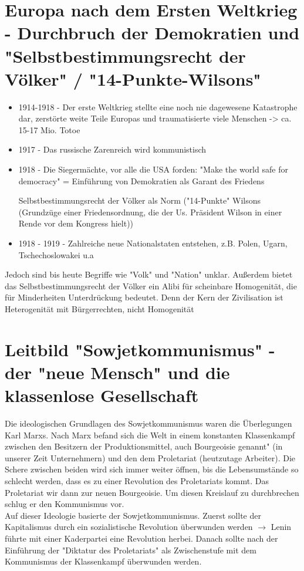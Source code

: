 \documentclass{article}
\begin{document}
\section*{Europa nach dem Ersten Weltkrieg - Durchbruch der Demokratien und "Selbstbestimmungsrecht der Völker" / "14-Punkte-Wilsons"}

\begin{itemize}
    \item 1914-1918 - Der erste Weltkrieg stellte eine noch nie
          dagewesene Katastrophe dar, zerstörte weite Teile
          Europas und traumatisierte viele Menschen -> ca. 15-17 Mio. Totoe
    \item 1917 - Das russische Zarenreich wird kommunistisch
    \item 1918 - Die Siegermächte, vor alle die USA forden:
          "Make the world safe for democracy" = Einführung von
          Demokratien als Garant des Friedens

          Selbstbestimmungsrecht der Völker als Norm
          ("14-Punkte" Wilsons (Grundzüge einer Friedensordnung,
          die der Us. Präsident Wilson in einer Rende vor dem
          Kongress hielt))

    \item 1918 - 1919 - Zahlreiche neue Nationalstaten entstehen, z.B.
          Polen, Ugarn, Tschechoslowakei u.a

\end{itemize}
Jedoch sind bis heute Begriffe wie "Volk" und "Nation" unklar.
Außerdem bietet das Selbstbestimmungsrecht der Völker ein Alibi
für scheinbare Homogenität, die für Minderheiten Unterdrückung
bedeutet. Denn der Kern der Zivilisation ist Heterogenität mit
Bürgerrechten, nicht Homogenität

\section*{Leitbild "Sowjetkommunismus" - der "neue Mensch" und die klassenlose Gesellschaft}
Die ideologischen Grundlagen des Sowjetkommunismus waren die
Überlegungen Karl Marxs. Nach Marx befand sich die Welt in
einem konstanten Klassenkampf zwischen den Besitzern der
Produktionsmittel, auch Bourgeoisie genannt" (in unserer Zeit Unternehmern) und den
dem Proletariat (heutzutage Arbeiter). Die Schere zwischen
beiden wird sich immer weiter öffnen, bis die Lebensumstände
so schlecht werden, dass es zu einer Revolution des Proletariats
kommt. Das Proletariat wir dann zur neuen Bourgeoisie. Um diesen
Kreislauf zu durchbrechen schlug er den Kommunismus vor.
\\Auf dieser Ideologie basierte der Sowjetkommunismus. Zuerst
sollte der Kapitalismus durch ein sozialistische Revolution
überwunden werden $\rightarrow$ Lenin führte mit einer Kaderpartei
eine Revolution herbei.  Danach sollte nach der Einführung der
"Diktatur des Proletariats" als Zwischenstufe mit dem Kommunismus
der Klassenkampf überwunden werden.
\end{document}
